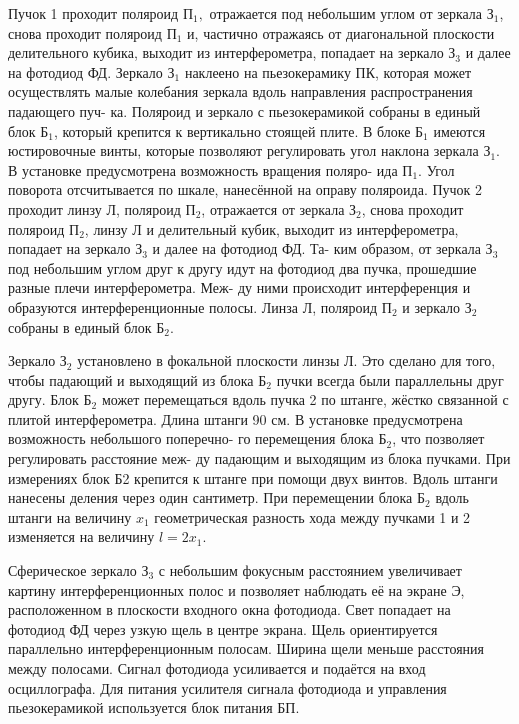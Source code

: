 \documentclass[12pt]{kiarticle}
\begin{document}
Пучок 1 проходит поляроид $ П_1, $ отражается под небольшим углом
от зеркала $ З_1 $, снова проходит поляроид $ П_1 $ и, частично отражаясь от
диагональной плоскости делительного кубика, выходит из интерферометра, попадает на зеркало $ З_3 $ и далее на фотодиод ФД. Зеркало $ З_1 $
наклеено на пьезокерамику ПК, которая может осуществлять малые колебания зеркала вдоль направления распространения падающего пуч-
ка. Поляроид и зеркало с пьезокерамикой собраны в единый блок $ Б_1 $,
который крепится к вертикально стоящей плите. В блоке $ Б_1 $ имеются
юстировочные винты, которые позволяют регулировать угол наклона
зеркала $ З_1 $. В установке предусмотрена возможность вращения поляро-
ида $ П_1 $. Угол поворота отсчитывается по шкале, нанесённой на оправу
поляроида.
Пучок 2 проходит линзу Л, поляроид $ П_2 $, отражается от зеркала $ З_2 $,
снова проходит поляроид $ П_2 $, линзу Л и делительный кубик, выходит из
интерферометра, попадает на зеркало $ З_3 $ и далее на фотодиод ФД. Та-
ким образом, от зеркала $ З_3 $ под небольшим углом друг к другу идут на
фотодиод два пучка, прошедшие разные плечи интерферометра. Меж-
ду ними происходит интерференция и образуются интерференционные
полосы. Линза Л, поляроид $ П_2 $ и зеркало $ З_2 $ собраны в единый блок $ Б_2 $.

Зеркало $ З_2 $ установлено в фокальной плоскости линзы Л. Это сделано
для того, чтобы падающий и выходящий из блока $ Б_2 $ пучки всегда были
параллельны друг другу. Блок $ Б_2 $ может перемещаться вдоль пучка 2
по штанге, жёстко связанной с плитой интерферометра. Длина штанги
90 см. В установке предусмотрена возможность небольшого поперечно-
го перемещения блока $ Б_2 $, что позволяет регулировать расстояние меж-
ду падающим и выходящим из блока пучками. При измерениях блок
Б2 крепится к штанге при помощи двух винтов. Вдоль штанги нанесены деления через один сантиметр. При перемещении блока $ Б_2 $ вдоль
штанги на величину $ x_1 $ геометрическая разность хода между пучками
1 и 2 изменяется на величину $ l = 2x_1 $.

Сферическое зеркало $ З_3 $ с небольшим фокусным расстоянием увеличивает картину интерференционных полос и позволяет наблюдать её
на экране Э, расположенном в плоскости входного окна фотодиода.
Свет попадает на фотодиод ФД через узкую щель в центре экрана.
Щель ориентируется параллельно интерференционным полосам. Ширина щели меньше расстояния между полосами. Сигнал фотодиода усиливается и подаётся на вход осциллографа. Для питания усилителя
сигнала фотодиода и управления пьезокерамикой используется блок
питания БП.
\end{document}
